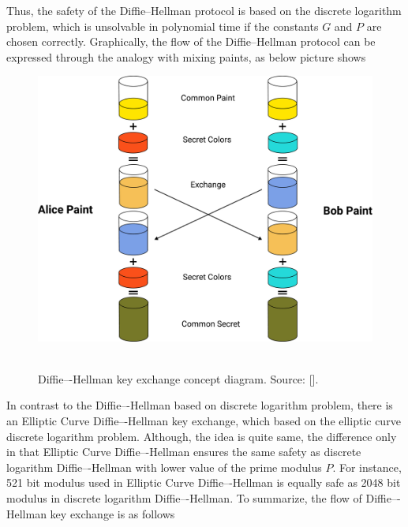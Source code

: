 Thus, the safety of the Diffie--Hellman protocol is based on the discrete logarithm problem, which is unsolvable
in polynomial time if the constants $G$ and $P$ are chosen correctly.
Graphically, the flow of the Diffie--Hellman protocol can be expressed through the
analogy with mixing paints, as below picture shows
\begin{figure}[H]
    \centering
    \includegraphics[width=1\textwidth]{Pictures/07_Diffie-Hellman_keyexchange_concept_diagram}
    ~\caption{Diffie–-Hellman key exchange concept diagram. Source: [\cite{mango2021figma}].}\label{fig:figure4}
\end{figure}
In contrast to the Diffie–-Hellman based on discrete logarithm problem, there is an Elliptic Curve Diffie–-Hellman
key exchange, which based on the elliptic curve discrete logarithm problem.
Although, the idea is quite same, the difference only in that Elliptic Curve Diffie–-Hellman ensures the same safety
as discrete logarithm Diffie–-Hellman with lower value of the prime modulus $P$.
For instance, 521 bit modulus used in Elliptic Curve Diffie–-Hellman is equally safe as 2048 bit modulus in
discrete logarithm Diffie–-Hellman.
To summarize, the flow of Diffie–-Hellman key exchange is as follows
